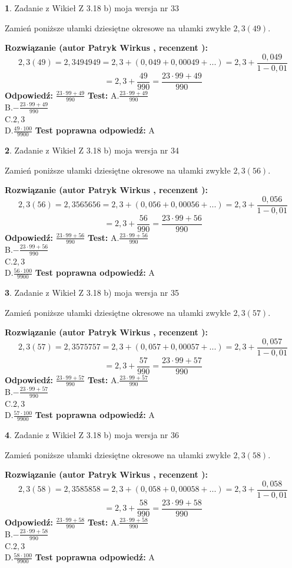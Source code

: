 \documentclass[12pt, a4paper]{article}
\theoremstyle{definition} %
\newtheorem{zad}{}
\newcommand{\zadStart}[1]{\begin{zad}#1\newline}
\newcommand{\zadStop}{\end{zad}}
\newcommand{\rozwStart}[2]{\noindent \textbf{Rozwiązanie (autor #1 , recenzent #2): }\newline}
\newcommand{\rozwStop}{\newline}
\newcommand{\odpStart}{\noindent \textbf{Odpowiedź:}\newline}
\newcommand{\odpStop}{\newline}
\newcommand{\testStart}{\noindent \textbf{Test:}\newline}
\newcommand{\testStop}{\newline}
\newcommand{\kluczStart}{\noindent \textbf{Test poprawna odpowiedź:}\newline}
\newcommand{\kluczStop}{\newline}
\begin{document}
\zadStart{Zadanie z Wikieł Z 3.18 b) moja wersja nr 33}

Zamień poniższe ułamki dziesiętne okresowe na ułamki zwykłe $2,3(49)$.
\zadStop
\rozwStart{Patryk Wirkus}{}
$$2,3(49)=2,3494949=2,3+(0,049+0,00049+...)=2,3+\frac{0,049}{1-0,01}$$
$$=2,3+\frac{49}{990}=\frac{23\cdot99+49}{990}$$
\rozwStop
\odpStart
$\frac{23\cdot99+49}{990}$
\odpStop
\testStart
A.$\frac{23\cdot99+49}{990}$\\ B.$-\frac{23\cdot99+49}{990}$\\ C.$2,3$\\ D.$\frac{49\cdot100}{9900}$
\testStop
\kluczStart
A
\kluczStop



\zadStart{Zadanie z Wikieł Z 3.18 b) moja wersja nr 34}

Zamień poniższe ułamki dziesiętne okresowe na ułamki zwykłe $2,3(56)$.
\zadStop
\rozwStart{Patryk Wirkus}{}
$$2,3(56)=2,3565656=2,3+(0,056+0,00056+...)=2,3+\frac{0,056}{1-0,01}$$
$$=2,3+\frac{56}{990}=\frac{23\cdot99+56}{990}$$
\rozwStop
\odpStart
$\frac{23\cdot99+56}{990}$
\odpStop
\testStart
A.$\frac{23\cdot99+56}{990}$\\ B.$-\frac{23\cdot99+56}{990}$\\ C.$2,3$\\ D.$\frac{56\cdot100}{9900}$
\testStop
\kluczStart
A
\kluczStop



\zadStart{Zadanie z Wikieł Z 3.18 b) moja wersja nr 35}

Zamień poniższe ułamki dziesiętne okresowe na ułamki zwykłe $2,3(57)$.
\zadStop
\rozwStart{Patryk Wirkus}{}
$$2,3(57)=2,3575757=2,3+(0,057+0,00057+...)=2,3+\frac{0,057}{1-0,01}$$
$$=2,3+\frac{57}{990}=\frac{23\cdot99+57}{990}$$
\rozwStop
\odpStart
$\frac{23\cdot99+57}{990}$
\odpStop
\testStart
A.$\frac{23\cdot99+57}{990}$\\ B.$-\frac{23\cdot99+57}{990}$\\ C.$2,3$\\ D.$\frac{57\cdot100}{9900}$
\testStop
\kluczStart
A
\kluczStop



\zadStart{Zadanie z Wikieł Z 3.18 b) moja wersja nr 36}

Zamień poniższe ułamki dziesiętne okresowe na ułamki zwykłe $2,3(58)$.
\zadStop
\rozwStart{Patryk Wirkus}{}
$$2,3(58)=2,3585858=2,3+(0,058+0,00058+...)=2,3+\frac{0,058}{1-0,01}$$
$$=2,3+\frac{58}{990}=\frac{23\cdot99+58}{990}$$
\rozwStop
\odpStart
$\frac{23\cdot99+58}{990}$
\odpStop
\testStart
A.$\frac{23\cdot99+58}{990}$\\ B.$-\frac{23\cdot99+58}{990}$\\ C.$2,3$\\ D.$\frac{58\cdot100}{9900}$
\testStop
\kluczStart
A
\kluczStop
\end{document}
